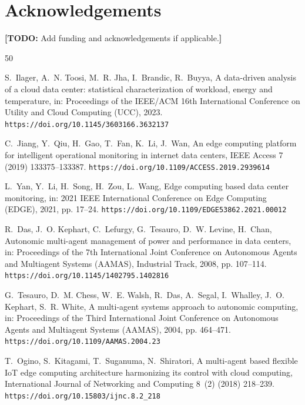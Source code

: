 \documentclass[preprint,11pt]{elsarticle}
\newcommand{\todo}[1]{\textcolor{red!70!black}{\textbf{[TODO:} #1\textbf{]}}}
\begin{document}
\section*{Acknowledgements}
\todo{Add funding and acknowledgements if applicable.}

\begin{thebibliography}{50}
\providecommand{\natexlab}[1]{#1}
\providecommand{\url}[1]{\texttt{#1}}


S.~Ilager, A.~N. Toosi, M.~R. Jha, I.~Brandic, R.~Buyya, A data-driven
analysis of a cloud data center: statistical characterization of
workload, energy and temperature, in: Proceedings of the IEEE/ACM 16th
International Conference on Utility and Cloud Computing (UCC), 2023.
\url{https://doi.org/10.1145/3603166.3632137}

C.~Jiang, Y.~Qiu, H.~Gao, T.~Fan, K.~Li, J.~Wan, An edge computing
platform for intelligent operational monitoring in internet data
centers, IEEE Access 7 (2019) 133375--133387.
\url{https://doi.org/10.1109/ACCESS.2019.2939614}

L.~Yan, Y.~Li, H.~Song, H.~Zou, L.~Wang, Edge computing based data
center monitoring, in: 2021 IEEE International Conference on Edge
Computing (EDGE), 2021, pp. 17--24.
\url{https://doi.org/10.1109/EDGE53862.2021.00012}

R.~Das, J.~O. Kephart, C.~Lefurgy, G.~Tesauro, D.~W. Levine, H.~Chan,
Autonomic multi-agent management of power and performance in data
centers, in: Proceedings of the 7th International Joint Conference on
Autonomous Agents and Multiagent Systems (AAMAS), Industrial Track,
2008, pp. 107--114.
\url{https://doi.org/10.1145/1402795.1402816}

G.~Tesauro, D.~M. Chess, W.~E. Walsh, R.~Das, A.~Segal, I.~Whalley,
J.~O. Kephart, S.~R. White, A multi-agent systems approach to autonomic
computing, in: Proceedings of the Third International Joint Conference
on Autonomous Agents and Multiagent Systems (AAMAS), 2004, pp.
464--471.
\url{https://doi.org/10.1109/AAMAS.2004.23}

T.~Ogino, S.~Kitagami, T.~Suganuma, N.~Shiratori, A multi-agent based
flexible IoT edge computing architecture harmonizing its control with
cloud computing, International Journal of Networking and Computing
8~(2) (2018) 218--239.
\url{https://doi.org/10.15803/ijnc.8.2_218}


\end{thebibliography}
\end{document}
